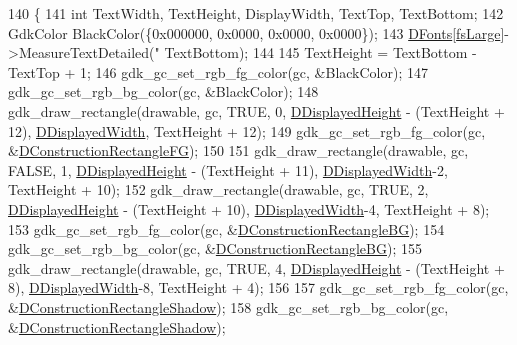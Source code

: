 \begin{DoxyCode}
140                                                                                              \{
141     \textcolor{keywordtype}{int} TextWidth, TextHeight, DisplayWidth, TextTop, TextBottom;
142     GdkColor BlackColor(\{0x000000, 0x0000, 0x0000, 0x0000\});
143     \hyperlink{classCUnitDescriptionRenderer_a270a545ecdb1602cd2a0a2def8997dc8}{DFonts}[\hyperlink{classCUnitDescriptionRenderer_a3ea4cd83b6dd9533ab3abb953a7da35aaf467097fe4f4811a5e2f1959c86e071d}{fsLarge}]->MeasureTextDetailed(\textcolor{stringliteral}{"%
      TextBottom);
144     
145     TextHeight = TextBottom - TextTop + 1;
146     gdk\_gc\_set\_rgb\_fg\_color(gc, &BlackColor);
147     gdk\_gc\_set\_rgb\_bg\_color(gc, &BlackColor);
148     gdk\_draw\_rectangle(drawable, gc, TRUE, 0, \hyperlink{classCUnitDescriptionRenderer_acc5f08d377a050f778614561a0b12a6c}{DDisplayedHeight} - (TextHeight + 12),  
      \hyperlink{classCUnitDescriptionRenderer_a4c472ecc82b5956fc65aeebb2faf17fd}{DDisplayedWidth}, TextHeight + 12);
149     gdk\_gc\_set\_rgb\_fg\_color(gc, &\hyperlink{classCUnitDescriptionRenderer_a2f4f541a008668f1b8fc55500443c1a3}{DConstructionRectangleFG});
150     
151     gdk\_draw\_rectangle(drawable, gc, FALSE, 1, \hyperlink{classCUnitDescriptionRenderer_acc5f08d377a050f778614561a0b12a6c}{DDisplayedHeight} - (TextHeight + 11),  
      \hyperlink{classCUnitDescriptionRenderer_a4c472ecc82b5956fc65aeebb2faf17fd}{DDisplayedWidth}-2, TextHeight + 10);
152     gdk\_draw\_rectangle(drawable, gc, TRUE, 2, \hyperlink{classCUnitDescriptionRenderer_acc5f08d377a050f778614561a0b12a6c}{DDisplayedHeight} - (TextHeight + 10),  
      \hyperlink{classCUnitDescriptionRenderer_a4c472ecc82b5956fc65aeebb2faf17fd}{DDisplayedWidth}-4, TextHeight + 8);
153     gdk\_gc\_set\_rgb\_fg\_color(gc, &\hyperlink{classCUnitDescriptionRenderer_a7a763ac1aec2ee9d3b70694e1fbe4f9d}{DConstructionRectangleBG});
154     gdk\_gc\_set\_rgb\_bg\_color(gc, &\hyperlink{classCUnitDescriptionRenderer_a7a763ac1aec2ee9d3b70694e1fbe4f9d}{DConstructionRectangleBG});
155     gdk\_draw\_rectangle(drawable, gc, TRUE, 4, \hyperlink{classCUnitDescriptionRenderer_acc5f08d377a050f778614561a0b12a6c}{DDisplayedHeight} - (TextHeight + 8),  
      \hyperlink{classCUnitDescriptionRenderer_a4c472ecc82b5956fc65aeebb2faf17fd}{DDisplayedWidth}-8, TextHeight + 4);
156     
157     gdk\_gc\_set\_rgb\_fg\_color(gc, &\hyperlink{classCUnitDescriptionRenderer_a8e19ce3520d89f775dc5de84c2985221}{DConstructionRectangleShadow});
158     gdk\_gc\_set\_rgb\_bg\_color(gc, &\hyperlink{classCUnitDescriptionRenderer_a8e19ce3520d89f775dc5de84c2985221}{DConstructionRectangleShadow});
}
\end{DoxyCode}
